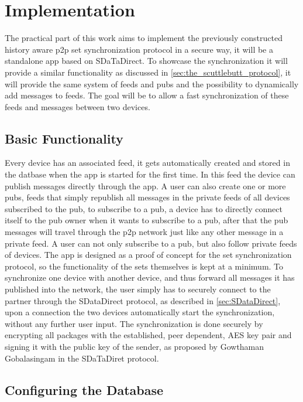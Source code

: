 \chapter{Implementation}

The practical part of this work aims to implement the previously constructed history aware p2p set synchronization protocol in a secure way, it will be a standalone app based on SDaTaDirect. To showcase the synchronization it will provide a similar functionality as discussed in \ref{sec:the_scuttlebutt_protocol}, it will provide the same system of feeds and pubs and the possibility to dynamically add messages to feeds. The goal will be to allow a fast synchronization of these feeds and messages between two devices.

\section{Basic Functionality}

Every device has an associated feed, it gets automatically created and stored in the datbase when the app is started for the first time. In this feed the device can publish messages directly through the app. A user can also create one or more pubs, feeds that simply republish all messages in the private feeds of all devices subscribed to the pub, to subscribe to a pub, a device has to directly connect itself to the pub owner when it wants to subscribe to a pub, after that the pub messages will travel through the p2p network just like any other message in a private feed. A user can not only subscribe to a pub, but also follow private feeds of devices. The app is designed as a proof of concept for the set synchronization protocol, so the functionality of the sets themselves is kept at a minimum. To synchronize one device with another device, and thus forward all messages it has published into the network, the user simply has to securely connect to the partner through the SDataDirect protocol, as described in \ref{sec:SDataDirect}, upon a connection the two devices automatically start the synchronization, without any further user input. The synchronization is done securely by encrypting all packages with the established, peer dependent, AES key pair and signing it with the public key of the sender, as proposed by Gowthaman Gobalasingam in the SDaTaDiret protocol. 


\section{Configuring the Database}


